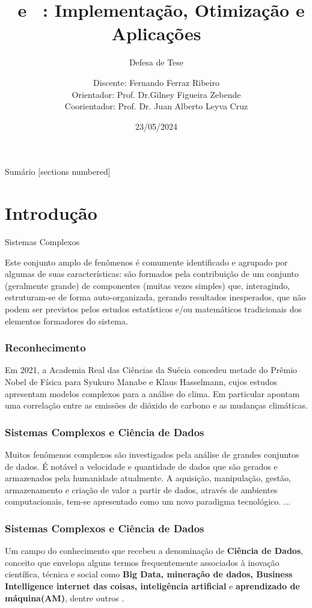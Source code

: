 \documentclass[11pt, aspectratio=169]{beamer}
\title{\pdcca~e \dmc~: Implementação, Otimização e Aplicações}
\subtitle{Defesa de Tese}
\date{23/05/2024}
\author{Discente: Fernando Ferraz Ribeiro \\Orientador: Prof. Dr.Gilney Figueira Zebende \\Coorientador: Prof. Dr. Juan Alberto Leyva Cruz}
\institute{PPGM UEFS - Feira de Santana, BA}
\begin{document}
\maketitle

\begin{frame}{Sumário}
  [sections numbered]
  \tableofcontents[hideallsubsections]
\end{frame}

\section{Introdução}

\begin{frame}[fragile]{Sistemas Complexos}

  Este conjunto amplo de fenômenos é comumente identificado e agrupado por algumas de suas características: são formados pela contribuição de um conjunto (geralmente grande) de componentes (muitas vezes simples) que, interagindo, estruturam-se de forma auto-organizada, gerando resultados inesperados, que não podem ser previstos pelos estudos estatísticos e/ou matemáticos tradicionais dos elementos formadores do sistema.

\end{frame}

\begin{frame}
  \frametitle{Reconhecimento}

  Em 2021, a Academia Real das Ciências da Suécia concedeu metade do Prêmio Nobel de Física para Syukuro Manabe e Klaus Hasselmann, cujos estudos apresentam modelos complexos para a análise do clima. Em particular apontam uma correlação entre as emissões de dióxido de carbono e as mudanças climáticas.

\end{frame}

\begin{frame}
  \frametitle{Sistemas Complexos e Ciência de Dados}

  Muitos fenômenos complexos são investigados pela análise de grandes conjuntos de dados. É notável a velocidade e quantidade de dados que são gerados e armazenados pela humanidade atualmente. A aquisição, manipulação, gestão, armazenamento e criação de valor a partir de dados, através de ambientes computacionais, tem-se apresentado como um novo paradigma tecnológico. ...

\end{frame}

\begin{frame}
  \frametitle{Sistemas Complexos e Ciência de Dados}
  Um campo do conhecimento que recebeu a denominação de \textbf{Ciência de Dados}, conceito que envelopa alguns termos frequentemente associados à inovação científica, técnica e social como \textbf{Big Data, mineração de dados, Business Intelligence internet das coisas, inteligência artificial} e \textbf{aprendizado de máquina(AM)}, dentre outros \cite[p. 12-13]{EMCdata2015}.
\end{frame}
\end{document}
